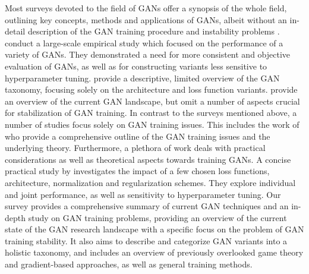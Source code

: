 \label{sec:relwork}
Most surveys devoted to the field of GANs offer a synopsis of the whole field, outlining key concepts, methods and applications of GANs, albeit without an in-detail description of the GAN training procedure and instability problems .  conduct a large-scale empirical study which focused on the performance of a variety of GANs. They demonstrated a need for more consistent and objective evaluation of GANs, as well as for constructing variants less sensitive to hyperparameter tuning.  provide a descriptive, limited overview of the GAN taxonomy, focusing solely on the architecture and loss function variants.  provide an overview of the current GAN landscape, but omit a number of aspects crucial for stabilization of GAN training. 
In contrast to the surveys mentioned above, a number of studies focus solely on GAN training issues. This includes the work of  who provide a comprehensive outline of the GAN training issues and the underlying theory. Furthermore, a plethora of work deals with practical considerations  as well as theoretical aspects  towards training GANs. A concise practical study by  investigates the impact of a few chosen loss functions, architecture, normalization and regularization schemes. They explore individual and joint performance, as well as sensitivity to hyperparameter tuning.
Our survey provides a comprehensive summary of current GAN techniques and an in-depth study on GAN training problems, providing an overview of the current state of the GAN research landscape with a specific focus on the problem of GAN training stability. It also aims to describe and categorize GAN variants into a holistic taxonomy, and includes an overview of previously overlooked game theory and gradient-based approaches, as well as general training methods.


